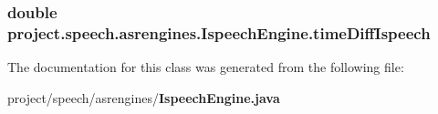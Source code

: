 \subsubsection[{time\+Diff\+Ispeech}]{\setlength{\rightskip}{0pt plus 5cm}double project.\+speech.\+asrengines.\+Ispeech\+Engine.\+time\+Diff\+Ispeech\hspace{0.3cm}{\ttfamily [private]}}\label{classproject_1_1speech_1_1asrengines_1_1_ispeech_engine_a0d129ec33fbe333f3337ceeead4e6994}


The documentation for this class was generated from the following file\+:\begin{DoxyCompactItemize}
\item 
project/speech/asrengines/{\bf Ispeech\+Engine.\+java}\end{DoxyCompactItemize}
